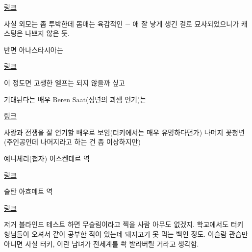 \href{https://www.google.co.kr/search?q=Erkan+Kol%C3%A7ak+K%C3%B6stendil&biw=1366&bih=614&source=lnms&tbm=isch&sa=X&ved=0ahUKEwiMwJ6MvajJAhVFE6YKHYKJChcQ$\_$AUIBigB#tbm=isch&q=+Ceyda+Olguner}{링크}
\vspace{5mm}

사실 외모는 좀 투박한데 몸매는 육감적인 $-$ 애 잘 낳게 생긴 걸로 묘사되었으니가 캐스팅은 나쁘지 않은 듯.
\vspace{5mm}

반면 아나스타시아는
\vspace{5mm}

\href{https://www.google.co.kr/search?q=Erkan+Kol%C3%A7ak+K%C3%B6stendil&biw=1366&bih=614&source=lnms&tbm=isch&sa=X&ved=0ahUKEwiMwJ6MvajJAhVFE6YKHYKJChcQ$\_$AUIBigB#tbm=isch&q=Anastasia+Tsilimpiou}{링크}
\vspace{5mm}

이 정도면 고생한 엘프는 되지 않을까 싶고
\vspace{5mm}

기대된다는 배우 Beren Saat(성년의 쾨셈 연기)는
\vspace{5mm}

\href{https://www.google.co.kr/search?q=Erkan+Kol%C3%A7ak+K%C3%B6stendil&biw=1366&bih=614&source=lnms&tbm=isch&sa=X&ved=0ahUKEwiMwJ6MvajJAhVFE6YKHYKJChcQ$\_$AUIBigB#tbm=isch&q=beren+saat}{링크}
\vspace{5mm}

사랑과 전쟁을 잘 연기할 배우로 보임(터키에서는 매우 유명하다던가)
나머지 꽃청년(주인공인데 나머지라고 하는 건 좀 이상하지만)
\vspace{5mm}

예니체리(첩자) 이스켄데르 역
\vspace{5mm}

\href{https://www.google.co.kr/search?q=Erkan+Kol%C3%A7ak+K%C3%B6stendil&biw=1366&bih=614&source=lnms&tbm=isch&sa=X&ved=0ahUKEwiMwJ6MvajJAhVFE6YKHYKJChcQ$\_$AUIBigB#tbm=isch&q=Berk+Cankat}{링크}
\vspace{5mm}

술탄 아흐메트 역
\vspace{5mm}

\href{https://www.google.co.kr/search?q=Erkan+Kol%C3%A7ak+K%C3%B6stendil&biw=1366&bih=614&source=lnms&tbm=isch&sa=X&ved=0ahUKEwiMwJ6MvajJAhVFE6YKHYKJChcQ$\_$AUIBigB#tbm=isch&q=Ekin+Ko%C3%A7}{링크}
\vspace{5mm}

저거 블라인드 테스트 하면 무슬림이라고 찍을 사람 아무도 없겠지.
학교에서도 터키 형님들이 오셔서 같이 공부한 적이 있는데 돼지고기 못 먹는 백인 정도.
이슬람 관습만 아니면 사실 터키, 이란 남녀가 전세계를 쏵 발라버릴 거라고 생각함.
\vspace{5mm}

